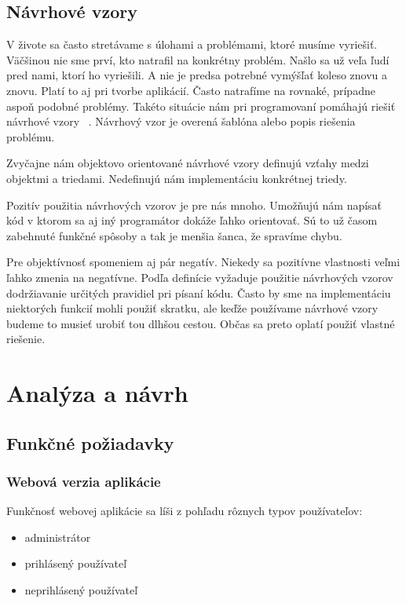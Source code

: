 \documentclass[12pt,onesided]{book}
\begin{document}
\section{Návrhové vzory}
V živote sa často stretávame s úlohami a problémami, ktoré musíme vyriešiť. Väčšinou nie sme prví, kto natrafil na konkrétny problém. Našlo sa už veľa ľudí pred nami, ktorí ho vyriešili. A nie je predsa potrebné vymýšľať koleso znovu a znovu. Platí to aj pri tvorbe aplikácií.  Často natrafíme na rovnaké, prípadne aspoň podobné problémy. Takéto situácie nám pri programovaní pomáhajú riešiť návrhové vzory \cite{NavrhoveVzory}\ . Návrhový vzor je overená šablóna alebo popis riešenia problému.

Zvyčajne nám objektovo orientované návrhové vzory definujú vzťahy medzi objektmi a triedami. Nedefinujú nám implementáciu konkrétnej triedy.  

Pozitív použitia návrhových vzorov je pre nás mnoho. Umožňujú nám napísať kód v ktorom sa aj iný programátor dokáže ľahko orientovať. Sú to už časom zabehnuté funkčné spôsoby a tak je menšia šanca, že spravíme chybu. 

Pre objektívnosť spomeniem aj pár negatív. Niekedy sa pozitívne vlastnosti veľmi ľahko zmenia na negatívne. Podľa definície vyžaduje použitie návrhových vzorov dodržiavanie určitých pravidiel pri písaní kódu. Často by sme na implementáciu niektorých funkcií mohli použiť skratku, ale keďže používame návrhové vzory budeme to musieť urobiť tou dlhšou cestou. Občas sa preto oplatí použiť vlastné riešenie.

\chapter{Analýza a návrh}
\section{Funkčné požiadavky}
\subsection{Webová verzia aplikácie}
Funkčnosť webovej aplikácie sa líši z pohľadu rôznych typov používateľov:
\begin{itemize}
\item{administrátor}
\item{prihlásený používateľ}
\item{neprihlásený používateľ}
\end{itemize}
\end{document}
